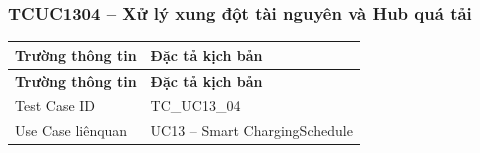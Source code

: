 \subsubsection{TCUC1304 – Xử lý xung đột tài nguyên và Hub quá tải}
\begin{longtable}{|L{0.24\textwidth}|L{0.70\textwidth}|}
\hline
\textbf{Trường thông tin} & \textbf{Đặc tả kịch bản} \\
\hline
\endfirsthead
\hline
\textbf{Trường thông tin} & \textbf{Đặc tả kịch bản} \\
\hline
\endhead
Test Case ID & TC\_UC13\_04 \\
\hline
Use Case liênquan & UC13 – Smart ChargingSchedule \\
\hline
\end{longtable}
\vspace{-0.5\baselineskip}

